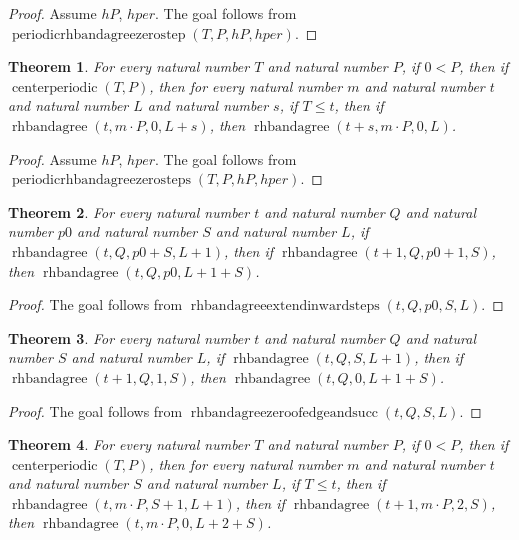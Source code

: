 \documentclass[11pt]{article}
\newtheorem{theorem}{Theorem}[section]
\theoremstyle{definition}
\begin{document}
\begin{proof}
Assume \(hP\), \(hper\).
The goal follows from \(\operatorname{periodicrhbandagreezerostep}(T, P, hP, hper)\).
\end{proof}
\begin{theorem}
\label{ll:paper:periodic-rhbandagree-zero-steps}
For every natural number \(T\) and natural number \(P\), if \(0 < P\), then if \(\operatorname{centerperiodic}(T, P)\), then for every natural number \(m\) and natural number \(t\) and natural number \(L\) and natural number \(s\), if \(T \le t\), then if \(\operatorname{rhbandagree}(t, m \cdot P, 0, L + s)\), then \(\operatorname{rhbandagree}(t + s, m \cdot P, 0, L)\).
\end{theorem}
\begin{proof}
Assume \(hP\), \(hper\).
The goal follows from \(\operatorname{periodicrhbandagreezerosteps}(T, P, hP, hper)\).
\end{proof}
\begin{theorem}
\label{ll:paper:rhbandagree-extend-inward-steps}
For every natural number \(t\) and natural number \(Q\) and natural number \(p0\) and natural number \(S\) and natural number \(L\), if \(\operatorname{rhbandagree}(t, Q, p0 + S, L + 1)\), then if \(\operatorname{rhbandagree}(t + 1, Q, p0 + 1, S)\), then \(\operatorname{rhbandagree}(t, Q, p0, L + 1 + S)\).
\end{theorem}
\begin{proof}
The goal follows from \(\operatorname{rhbandagreeextendinwardsteps}(t, Q, p0, S, L)\).
\end{proof}
\begin{theorem}
\label{ll:paper:rhbandagree-zero-of-edge-and-succ}
For every natural number \(t\) and natural number \(Q\) and natural number \(S\) and natural number \(L\), if \(\operatorname{rhbandagree}(t, Q, S, L + 1)\), then if \(\operatorname{rhbandagree}(t + 1, Q, 1, S)\), then \(\operatorname{rhbandagree}(t, Q, 0, L + 1 + S)\).
\end{theorem}
\begin{proof}
The goal follows from \(\operatorname{rhbandagreezeroofedgeandsucc}(t, Q, S, L)\).
\end{proof}
\begin{theorem}
\label{ll:paper:periodic-rhbandagree-bounce-zero}
For every natural number \(T\) and natural number \(P\), if \(0 < P\), then if \(\operatorname{centerperiodic}(T, P)\), then for every natural number \(m\) and natural number \(t\) and natural number \(S\) and natural number \(L\), if \(T \le t\), then if \(\operatorname{rhbandagree}(t, m \cdot P, S + 1, L + 1)\), then if \(\operatorname{rhbandagree}(t + 1, m \cdot P, 2, S)\), then \(\operatorname{rhbandagree}(t, m \cdot P, 0, L + 2 + S)\).
\end{theorem}
\end{document}
